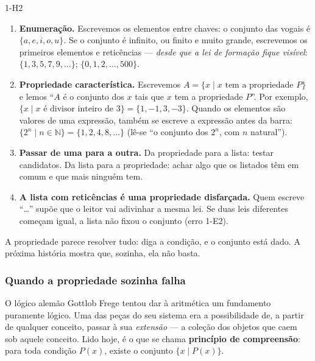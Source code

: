 \begin{construcao}{1-H2}
\begin{enumerate}[label=(\arabic*)]
  \item \textbf{Enumeração.} Escrevemos os elementos entre chaves: o conjunto das vogais é $\{a, e, i, o, u\}$. Se o conjunto é infinito, ou finito e muito grande, escrevemos os primeiros elementos e reticências — \emph{desde que a lei de formação fique visível}: $\{1, 3, 5, 7, 9, \ldots\}$; $\{0, 1, 2, \ldots, 500\}$.
  \item \textbf{Propriedade característica.} Escrevemos $A=\{x\mid x \text{ tem a propriedade } P\}$ e lemos \enquote{$A$ é o conjunto dos $x$ tais que $x$ tem a propriedade $P$}. Por exemplo, $\{x\mid x\text{ é divisor inteiro de }3\}=\{1,-1,3,-3\}$. Quando os elementos são valores de uma expressão, também se escreve a expressão antes da barra: $\{2^n\mid n\in\mathbb{N}\}=\{1,2,4,8,\ldots\}$ (lê-se \enquote{o conjunto dos $2^n$, com $n$ natural}).
  \item \textbf{Passar de uma para a outra.} Da propriedade para a lista: testar candidatos. Da lista para a propriedade: achar algo que os listados têm em comum e que mais ninguém tem.
  \item \textbf{A lista com reticências é uma propriedade disfarçada.} Quem escreve \enquote{\ldots} supõe que o leitor vai adivinhar a mesma lei. Se duas leis diferentes começam igual, a lista não fixou o conjunto (erro 1-E2).
\end{enumerate}
\end{construcao}

A propriedade parece resolver tudo: diga a condição, e o conjunto está dado. A próxima história mostra que, sozinha, ela não basta.

\subsubsection{Quando a propriedade sozinha falha}
O lógico alemão Gottlob Frege tentou dar à aritmética um fundamento puramente lógico. Uma das peças do seu sistema era a possibilidade de, a partir de qualquer conceito, passar à sua \emph{extensão} — a coleção dos objetos que caem sob aquele conceito. Lido hoje, é o que se chama \textbf{princípio de compreensão}: para toda condição $P(x)$, existe o conjunto $\{x\mid P(x)\}$.

